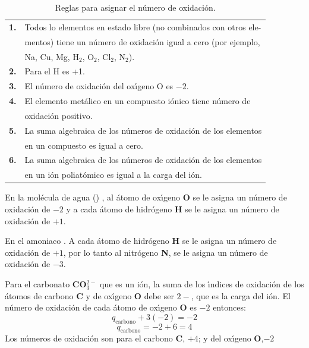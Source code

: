\begin{table}[ht]
\caption{Reglas para asignar el n\'umero de oxidaci\'on.}
\begin{center}
\begin{tabular}{ cl }\hline
\textbf{1.}& Todos lo elementos en estado libre (no combinados con otros ele-\\
&mentos) tiene un n\'umero de oxidaci\'on igual a
 cero (por ejemplo,\\
&Na, Cu, Mg, H$_2$, O$_2$, Cl$_2$, N$_2$).\\
\textbf{2.}& Para el H es +1.\\
\textbf{3.}& El n\'umero de oxidaci\'on del ox\'{\i}geno O es $-2$.\\
\textbf{4.}& El elemento met\'alico en un compuesto i\'onico tiene n\'umero de\\
&oxidaci\'on positivo.\\
\textbf{5.}& La suma algebraica de los n\'umeros de oxidaci\'on de los elementos\\ &en un
compuesto es igual a cero.\\
\textbf{6.}& La suma algebraica de los n\'umeros de oxidaci\'on de los elementos\\ &en un
i\'on poliat\'omico es igual a la carga del i\'on.\\ \hline
\end{tabular}
\end{center}
\label{tab:5}
\end{table}

En la mol\'ecula de agua () , al \'atomo de ox\'{\i}geno 
\textbf{O} se le asigna un n\'umero de oxidaci\'on de $-2$ y a cada \'atomo de hidr\'ogeno
\textbf{H} se le asigna un n\'umero de oxidaci\'on de $+1$.

 En el amoniaco . A cada \'atomo de hidr\'ogeno
\textbf{H} se le asigna un n\'umero de oxidaci\'on de $+1$, por lo tanto al nitr\'ogeno
\textbf{N}, se le asigna un n\'umero de oxidaci\'on de $-3$.

Para el carbonato \textbf{CO}$^{2-}_3$ que es un i\'on, la suma de los \'{\i}ndices de
oxidaci\'on de los \'atomos de carbono \textbf{C} y de ox\'{\i}geno \textbf{O} debe ser $2-$,  
que es la carga del i\'on. El n\'umero de oxidaci\'on de cada \'atomo de
ox\'{\i}geno \textbf{O} es $-2$ entonces:
 $$q_{\textrm{carbono}} + 3(-2) = -2$$
$$q_{\textrm{carbono}} = -2 + 6 = 4$$
Los n\'umeros de oxidaci\'on son para el carbono \textbf{C}, $+4$; y del ox\'{\i}geno
\textbf{O},$-2$

